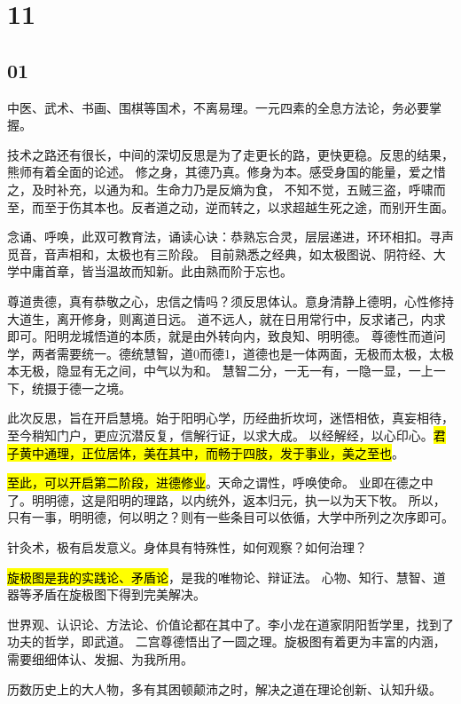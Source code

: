 \section{11}

\subsection{01}

中医、武术、书画、围棋等国术，不离易理。一元四素的全息方法论，务必要掌握。

技术之路还有很长，中间的深切反思是为了走更长的路，更快更稳。反思的结果，熊师有着全面的论述。
修之身，其德乃真。修身为本。感受身国的能量，爱之惜之，及时补充，以通为和。生命力乃是反熵为食，
不知不觉，五贼三盗，呼啸而至，而至于伤其本也。反者道之动，逆而转之，以求超越生死之途，而别开生面。

念诵、呼唤，此双可教育法，诵读心诀：恭熟忘合灵，层层递进，环环相扣。寻声觅音，音声相和，太极也有三阶段。
目前熟悉之经典，如太极图说、阴符经、大学中庸首章，皆当温故而知新。此由熟而阶于忘也。

尊道贵德，真有恭敬之心，忠信之情吗？须反思体认。意身清静上德明，心性修持大道生，离开修身，则离道日远。
道不远人，就在日用常行中，反求诸己，内求即可。阳明龙城悟道的本质，就是由外转向内，致良知、明明德。
尊德性而道问学，两者需要统一。德统慧智，道0而德1，道德也是一体两面，无极而太极，太极本无极，隐显有无之间，中气以为和。
慧智二分，一无一有，一隐一显，一上一下，统摄于德一之境。

此次反思，旨在开启慧境。始于阳明心学，历经曲折坎坷，迷悟相依，真妄相待，至今稍知门户，更应沉潜反复，信解行证，以求大成。
以经解经，以心印心。\hl{君子黄中通理，正位居体，美在其中，而畅于四肢，发于事业，美之至也}。

\hl{至此，可以开启第二阶段，进德修业}。天命之谓性，呼唤使命。
业即在德之中了。明明德，这是阳明的理路，以内统外，返本归元，执一以为天下牧。
所以，只有一事，明明德，何以明之？则有一些条目可以依循，大学中所列之次序即可。

针灸术，极有启发意义。身体具有特殊性，如何观察？如何治理？

\hl{旋极图是我的实践论、矛盾论}，是我的唯物论、辩证法。
心物、知行、慧智、道器等矛盾在旋极图下得到完美解决。

世界观、认识论、方法论、价值论都在其中了。李小龙在道家阴阳哲学里，找到了功夫的哲学，即武道。
二宫尊德悟出了一圆之理。旋极图有着更为丰富的内涵，需要细细体认、发掘、为我所用。

历数历史上的大人物，多有其困顿颠沛之时，解决之道在理论创新、认知升级。

